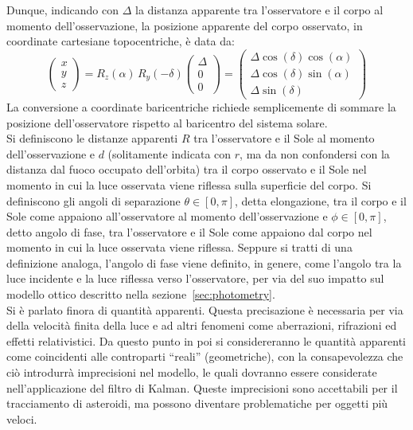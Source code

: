 \documentclass[12pt,a4paper,openright,twoside]{book}
\begin{document}
Dunque, indicando con $\Delta$ la distanza apparente tra l'osservatore e il corpo al momento dell'osservazione, la posizione apparente del corpo osservato, in coordinate cartesiane topocentriche, è data da:
\begin{equation}\label{eq:radec2pos}
\begin{pmatrix} x \\ y \\ z \end{pmatrix}=R_z(\alpha)\,R_y(-\delta)\begin{pmatrix} \Delta \\ 0 \\ 0 \end{pmatrix}=\begin{pmatrix} \Delta\cos(\delta)\cos(\alpha) \\ \Delta\cos(\delta)\sin(\alpha) \\ \Delta\sin(\delta) \end{pmatrix}
\end{equation}
La conversione a coordinate baricentriche richiede semplicemente di sommare la posizione dell'osservatore rispetto al baricentro del sistema solare. \\

Si definiscono le distanze apparenti $R$ tra l'osservatore e il Sole al momento dell'osservazione e $d$ (solitamente indicata con $r$, ma da non confondersi con la distanza dal fuoco occupato dell'orbita) tra il corpo osservato e il Sole nel momento in cui la luce osservata viene riflessa sulla superficie del corpo. Si definiscono gli angoli di separazione $\theta\in[0,\pi]$, detta elongazione, tra il corpo e il Sole come appaiono all'osservatore al momento dell'osservazione e $\phi\in[0,\pi]$, detto angolo di fase, tra l'osservatore e il Sole come appaiono dal corpo nel momento in cui la luce osservata viene riflessa. Seppure si tratti di una definizione analoga, l'angolo di fase viene definito, in genere, come l'angolo tra la luce incidente e la luce riflessa verso l'osservatore, per via del suo impatto sul modello ottico descritto nella sezione~\ref{sec:photometry}. \\

Si è parlato finora di quantità apparenti. Questa precisazione è necessaria per via della velocità finita della luce e ad altri fenomeni come aberrazioni, rifrazioni ed effetti relativistici. Da questo punto in poi si considereranno le quantità apparenti come coincidenti alle controparti ``reali'' (geometriche), con la consapevolezza che ciò introdurrà imprecisioni nel modello, le quali dovranno essere considerate nell'applicazione del filtro di Kalman. Queste imprecisioni sono accettabili per il tracciamento di asteroidi, ma possono diventare problematiche per oggetti più veloci.
\end{document}
